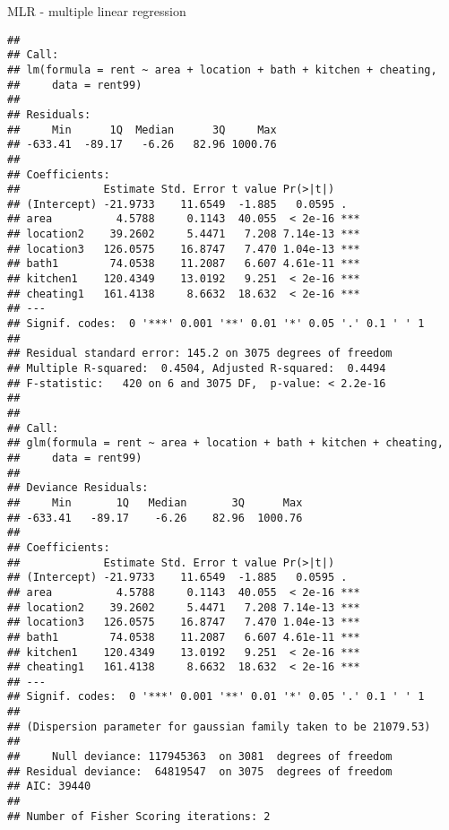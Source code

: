 \documentclass[ignorenonframetext,]{beamer}
\begin{document}
\begin{frame}[fragile]
\begin{block}{MLR - multiple linear regression}
\begin{verbatim}
## 
## Call:
## lm(formula = rent ~ area + location + bath + kitchen + cheating, 
##     data = rent99)
## 
## Residuals:
##     Min      1Q  Median      3Q     Max 
## -633.41  -89.17   -6.26   82.96 1000.76 
## 
## Coefficients:
##             Estimate Std. Error t value Pr(>|t|)    
## (Intercept) -21.9733    11.6549  -1.885   0.0595 .  
## area          4.5788     0.1143  40.055  < 2e-16 ***
## location2    39.2602     5.4471   7.208 7.14e-13 ***
## location3   126.0575    16.8747   7.470 1.04e-13 ***
## bath1        74.0538    11.2087   6.607 4.61e-11 ***
## kitchen1    120.4349    13.0192   9.251  < 2e-16 ***
## cheating1   161.4138     8.6632  18.632  < 2e-16 ***
## ---
## Signif. codes:  0 '***' 0.001 '**' 0.01 '*' 0.05 '.' 0.1 ' ' 1
## 
## Residual standard error: 145.2 on 3075 degrees of freedom
## Multiple R-squared:  0.4504, Adjusted R-squared:  0.4494 
## F-statistic:   420 on 6 and 3075 DF,  p-value: < 2.2e-16
## 
## 
## Call:
## glm(formula = rent ~ area + location + bath + kitchen + cheating, 
##     data = rent99)
## 
## Deviance Residuals: 
##     Min       1Q   Median       3Q      Max  
## -633.41   -89.17    -6.26    82.96  1000.76  
## 
## Coefficients:
##             Estimate Std. Error t value Pr(>|t|)    
## (Intercept) -21.9733    11.6549  -1.885   0.0595 .  
## area          4.5788     0.1143  40.055  < 2e-16 ***
## location2    39.2602     5.4471   7.208 7.14e-13 ***
## location3   126.0575    16.8747   7.470 1.04e-13 ***
## bath1        74.0538    11.2087   6.607 4.61e-11 ***
## kitchen1    120.4349    13.0192   9.251  < 2e-16 ***
## cheating1   161.4138     8.6632  18.632  < 2e-16 ***
## ---
## Signif. codes:  0 '***' 0.001 '**' 0.01 '*' 0.05 '.' 0.1 ' ' 1
## 
## (Dispersion parameter for gaussian family taken to be 21079.53)
## 
##     Null deviance: 117945363  on 3081  degrees of freedom
## Residual deviance:  64819547  on 3075  degrees of freedom
## AIC: 39440
## 
## Number of Fisher Scoring iterations: 2
\end{verbatim}

\end{block}

\end{frame}
\end{document}
